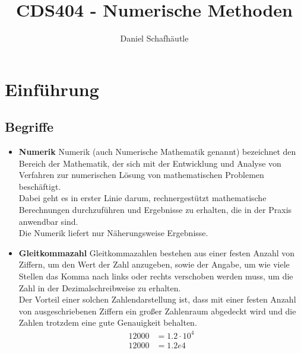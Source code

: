 \documentclass [final]{article}
\theoremstyle{definition}
\begin{document}
\title {CDS404 - Numerische Methoden}
\author {Daniel Schafhäutle}
\maketitle

\tableofcontents


\section {Einführung}
\subsection{Begriffe}
\begin{itemize}
	\item {\bfseries Numerik} \linebreak
	Numerik (auch Numerische Mathematik genannt) bezeichnet den Bereich der Mathematik, der sich mit der Entwicklung und Analyse von Verfahren zur numerischen Lösung von mathematischen Problemen beschäftigt. \\
	Dabei geht es in erster Linie darum, rechnergestützt mathematische Berechnungen durchzuführen und Ergebnisse zu erhalten, die in der Praxis anwendbar sind. \\
	Die Numerik liefert nur Näherungsweise Ergebnisse.
	\item {\bfseries Gleitkommazahl} \linebreak
	Gleitkommazahlen bestehen aus einer festen Anzahl von Ziffern, um den Wert der Zahl anzugeben, sowie der Angabe, um wie viele Stellen das Komma nach links oder rechts verschoben werden muss, um die Zahl in der Dezimalschreibweise zu erhalten. \\
	Der Vorteil einer solchen Zahlendarstellung ist, dass mit einer festen Anzahl von ausgeschriebenen Ziffern ein großer Zahlenraum abgedeckt wird und die Zahlen trotzdem eine gute Genauigkeit behalten.\\

	\begin{align*}
	12000  &=  1.2\cdot10^4 \\
	12000 &=  1.2e4
	\end{align*}


\end{itemize}
\end{document}
